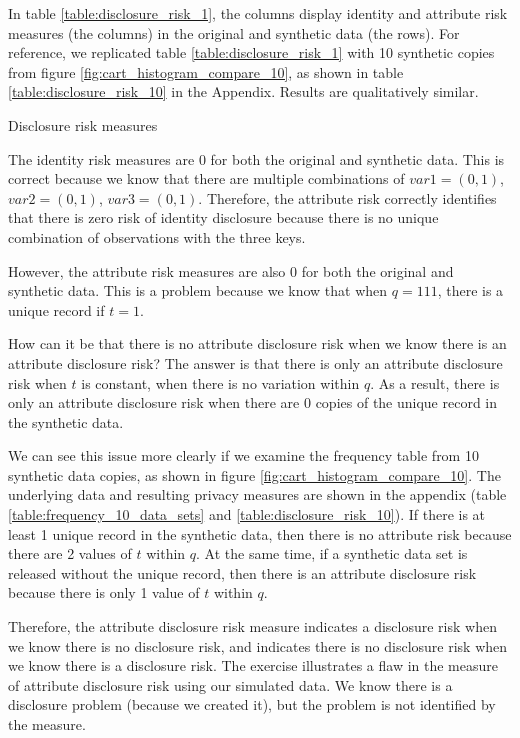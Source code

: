 \documentclass[runningheads]{llncs}
\begin{document}
In table \ref{table:disclosure_risk_1}, the columns display identity and attribute risk measures (the columns) in the original and synthetic data (the rows).  For reference, we replicated table \ref{table:disclosure_risk_1} with 10 synthetic copies from figure \ref{fig:cart_histogram_compare_10}, as shown in table \ref{table:disclosure_risk_10} in the Appendix.  Results are qualitatively similar.  

\begin{table}[]
    \centering
    \caption{Disclosure risk measures}
    
    \label{table:disclosure_risk_1}
\end{table}

The identity risk measures are 0 for both the original and synthetic data.  This is correct because we know that there are multiple combinations of $var1=(0,1)$, $var2=(0,1)$, $var3=(0,1)$.  Therefore, the attribute risk correctly identifies that there is zero risk of identity disclosure because there is no unique combination of observations with the three keys.

However, the attribute risk measures are also 0 for both the original and synthetic data.  This is a problem because we know that when $q=111$, there is a unique record if $t=1$.  

How can it be that there is no attribute disclosure risk when we know there is an attribute disclosure risk?  The answer is that there is only an attribute disclosure risk when $t$ is constant, when there is no variation within $q$.  As a result, there is only an attribute disclosure risk when there are 0 copies of the unique record in the synthetic data.  

We can see this issue more clearly if we examine the frequency table from 10 synthetic data copies, as shown in figure \ref{fig:cart_histogram_compare_10}.  The underlying data and resulting privacy measures are shown in the appendix (table \ref{table:frequency_10_data_sets} and \ref{table:disclosure_risk_10}).  If there is at least 1 unique record in the synthetic data, then there is no attribute risk because there are 2 values of $t$ within $q$.  At the same time, if a synthetic data set is released without the unique record, then there is an attribute disclosure risk because there is only 1 value of $t$ within $q$.  

Therefore, the attribute disclosure risk measure indicates a disclosure risk when we know there is no disclosure risk, and indicates there is no disclosure risk when we know there is a disclosure risk.  The exercise illustrates a flaw in the measure of attribute disclosure risk using our simulated data.  We know there is a disclosure problem (because we created it), but the problem is not identified by the measure.  
\end{document}
